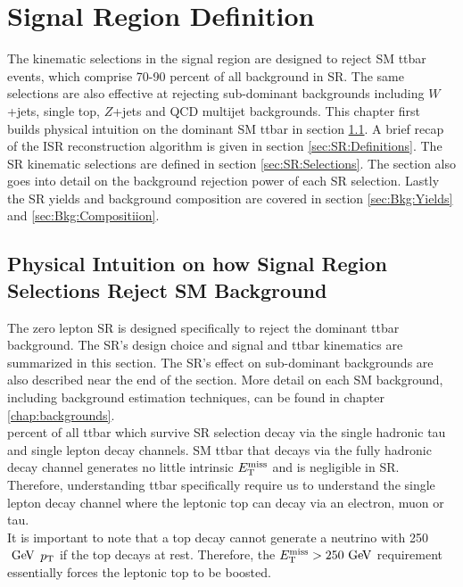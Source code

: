 
\chapter{Signal Region Definition}
\label{chap:SignalRegion}

\indent The kinematic selections in the signal region are designed to reject SM ttbar events, which comprise 70-90 percent of all background in SR.  The same selections are also effective at rejecting sub-dominant backgrounds including $W$+jets, single top, $Z$+jets and QCD multijet backgrounds.  This chapter first builds physical intuition on the dominant SM ttbar in section \ref{sec:SR:physical}.  A brief recap of the ISR reconstruction algorithm is given in section \ref{sec:SR:Definitions}.  The SR kinematic selections are defined in section \ref{sec:SR:Selections}.  The section also goes into detail on the background rejection power of each SR selection. Lastly the SR yields and background composition are covered in section \ref{sec:Bkg:Yields} and \ref{sec:Bkg:Compositiion}.  \\

\section{Physical Intuition on how Signal Region Selections Reject SM Background}
\label{sec:SR:physical}

\indent The zero lepton SR is designed specifically to reject the dominant ttbar background.  The SR's design choice and signal and ttbar kinematics are summarized in this section.  The SR's effect on sub-dominant backgrounds are also described near the end of the section. More detail on each SM background, including background estimation techniques, can be found in chapter \ref{chap:backgrounds}. \\

 percent of all ttbar which survive SR selection decay via the single hadronic tau and single lepton decay channels.  SM ttbar that decays via the fully hadronic decay channel generates no little intrinsic $E_{\mathrm{T}}^{\mathrm{miss}}$ and is negligible in SR.  Therefore, understanding ttbar specifically require us to understand the single lepton decay channel where the leptonic top can decay via an electron, muon or tau. \\

\indent It is important to note that a top decay cannot generate a neutrino with 250 $\gev$ $p_{\mathrm{T}}$ if the top decays at rest.  Therefore, the $\MET > 250 \gev$ requirement essentially forces the leptonic top to be boosted.   \\

